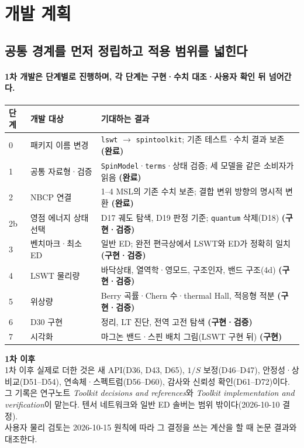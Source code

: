 
\section{개발 계획}



\subsection{공통 경계를 먼저 정립하고 적용 범위를 넓힌다}\label{development-roadmap}
\begingroup%
  \framesubtitle{1차 개발은 단계별로 진행하며, 각 단계는 구현·수치 대조·사용자 확인 뒤 넘어간다.}
  \footnotesize
  \begin{tabularx}{\textwidth}{@{}p{0.8cm}p{3.3cm}Y@{}}
    \toprule
    단계 & 개발 대상 & 기대하는 결과 \\
     & 패키지 이름 변경 & \texttt{lswt} $\to$ \texttt{spintoolkit}; 기존 테스트·수치 결과 보존 \textbf{(완료)} \\
    1 & 공통 자료형·검증 & \texttt{SpinModel}·\texttt{terms}·상태 검증; 세 모델을 같은 소비자가 읽음 \textbf{(완료)} \\
    2 & NBCP 연결 & 1--4 MSL의 기존 수치 보존; 결합 변위 방향의 명시적 변환 \textbf{(완료)} \\
    2b & 영점 에너지 상태 선택 & D17 궤도 탐색, D19 판정 기준; \texttt{quantum} 삭제(D18) \textbf{(구현·검증)} \\
    3 & 벤치마크·최소 ED & 일반 ED; 완전 편극상에서 LSWT와 ED가 정확히 일치 \textbf{(구현·검증)} \\
    4 & LSWT 물리량 & 바닥상태, 열역학·영모드, 구조인자, 밴드 구조(4d) \textbf{(구현·검증)} \\
    5 & 위상량 & Berry 곡률·Chern 수·thermal Hall, 적응형 적분 \textbf{(구현·검증)} \\
    6 & D30 구현 & 정리, LT 진단, 전역 고전 탐색 \textbf{(구현·검증)} \\
    7 & 시각화 & 마그논 밴드·스핀 배치 그림(LSWT 구현 뒤) \textbf{(구현)} \\
    \bottomrule
  \end{tabularx}
  \par\medskip
  \textbf{1차 이후}\\[0.4em]
  1차 이후 실제로 더한 것은 새 API(D36, D43, D65), $1/S$ 보정(D46--D47), 안정성·상 비교(D51--D54), 연속체·스펙트럼(D56--D60), 감사와 신뢰성 확인(D61--D72)이다. 그 기록은 연구노트 \emph{Toolkit decisions and references}와 \emph{Toolkit implementation and verification}이 맡는다. 텐서 네트워크와 일반 ED 솔버는 범위 밖이다(2026-10-10 결정).\\[0.4em]
  사용자 물리 검토는 2026-10-15 원칙에 따라 그 결정을 쓰는 계산을 할 때 논문 결과와 대조한다.\\[0.4em]
\endgroup


